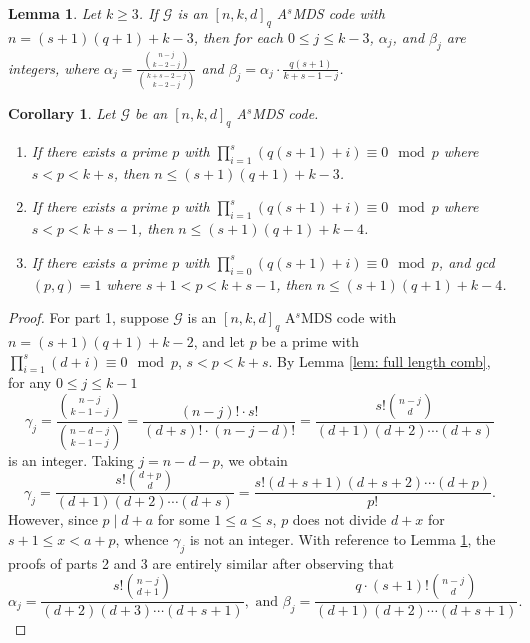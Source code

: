 \documentclass[10pt,a4paper]{amsart}
\newtheorem{lemma}{Lemma}
\newtheorem{corollary}{Corollary}
\newcommand{\AS}{ A$^s$MDS }
\newcommand{\G}{\mathcal{G}}
\begin{document}
	\begin{lemma}\label{lem: alpha beta}
		Let $k\ge 3$. If $\G$ is an $[n,k,d]_q$ \AS code with $n=(s+1)(q+1)+k-3$, then for each $0\le j\le k-3$,  $\alpha_j$, and $\beta_j$ are integers, where $\alpha_j = \frac{{n-j\choose k-2-j}}{{k+s-2-j \choose k-2-j}}$ and  $\beta_j = \alpha_j \cdot  \frac{q(s+1)}{k+s-1-j}$.
	\end{lemma}

	\begin{corollary}\label{cor: prime divisors}
		Let $\G$ be an $[n,k,d]_q$ \AS code.
		\begin{enumerate}
			\item If there exists a prime $p$ with $\prod_{i=1}^{s} (q(s+1)+i) \equiv 0 \mod p$ where $s<p<k+s$, then $n\le (s+1)(q+1)+k-3$. \label{part: 1 cor: prime divisors}
			\item If there exists a prime $p$ with $\prod_{i=1}^{s} (q(s+1)+i) \equiv 0 \mod p$ where $s<p<k+s-1$, then $n\le (s+1)(q+1)+k-4$. \label{part: 2 cor: prime divisors}
			\item If there exists a prime $p$ with $\prod_{i=0}^{s} (q(s+1)+i) \equiv 0 \mod p$, and gcd$(p,q)=1$ where $s+1<p<k+s-1$, then $n\le (s+1)(q+1)+k-4$. \label{part: 3 cor: prime divisors}
		\end{enumerate}
	\end{corollary}

	\begin{proof}
		For part 1, suppose $\G$ is an $[n,k,d]_q$ \AS code with $n=(s+1)(q+1)+k-2$, and let $p$ be a prime with $\prod_{i=1}^{s} (d+i) \equiv 0 \mod p$, $s<p<k+s$. By Lemma \ref{lem: full length comb}, for any $0\le j \le k-1$
		\begin{equation}
			\gamma_j = \frac{{n-j\choose k-1-j}}{{n-d-j \choose k-1-j}} = \frac{(n-j)!\cdot s!}{(d+s)!\cdot (n-j-d)!} =\frac{s!{n-j \choose d}}{(d+1)(d+2)\cdots (d+s)}
		\end{equation}
		is an integer.  Taking $j=n-d-p$, we obtain
		\begin{equation}
			\gamma_j  =\frac{s!{d+p \choose d}}{(d+1)(d+2)\cdots (d+s)} =\frac{s!(d+s+1)(d+s+2)\cdots (d+p)}{p!}.
		\end{equation}
		However, since $p\mid d+a$ for some $1\le a\le s$, $p$ does not divide $d+x$ for $s+1\le x <a+p$, whence $\gamma_j$ is not an integer.
		With reference to Lemma \ref{lem: alpha beta}, the proofs of parts 2 and 3 are entirely similar after observing that
		\[
		\alpha_j = \frac{s!{n-j \choose d+1}}{(d+2)(d+3)\cdots (d+s+1)}, \text{ and } \beta_j = \frac{q\cdot (s+1)!{n-j \choose d}}{(d+1)(d+2)\cdots (d+s+1)}.
		\]
	\end{proof}
\end{document}
